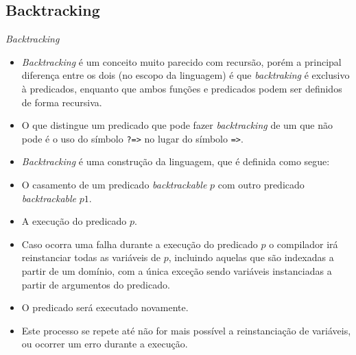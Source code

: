 
\subsection{Backtracking}
\begin{frame}{\textit{Backtracking}}
    
    \begin{itemize}
    
        \item \textit{Backtracking} é um conceito muito parecido com recursão, porém a principal diferença entre os dois
        (no escopo da linguagem) é que \textit{backtraking} é exclusivo à predicados, enquanto que ambos funções e 
        predicados podem ser definidos de forma recursiva.
        
        \item O que distingue um predicado que pode fazer \textit{backtracking} de um que não pode é o uso do símbolo
        \verb!?=>! no lugar do símbolo \verb!=>!.
        
        \item \textit{Backtracking} é uma construção da linguagem, que é definida como segue:
        
    \end{itemize}   
        
    \framebreak

    \begin{itemize}
        
        \item O casamento de um predicado \textit{backtrackable} $p$ com outro predicado \textit{backtrackable} $p1$.
        
        \item A execução do predicado $p$.
        
        \item Caso ocorra uma falha durante a execução do predicado $p$ o compilador irá reinstanciar todas as variáveis de 
        $p$, incluindo aquelas que são indexadas a partir de um domínio, com a única exceção sendo variáveis instanciadas a
        partir de argumentos do predicado.
        
        \item O predicado será executado novamente.
        
        \item Este processo se repete até não for mais possível a reinstanciação de variáveis, ou ocorrer um erro durante a
        execução.
    \end{itemize}

\end{frame}

